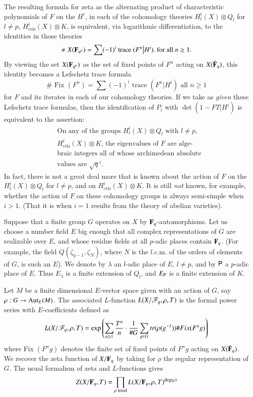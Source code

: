 The resulting formula for zeta as the alternating product of characteristic polynomials of $F$ on the $H^i$, in each of the cohomology theories $H^i_l (X) \otimes Q_l$ for $l \neq p$, $H^i_{\text{cris}} (X) \otimes K$, is equivalent, via logarithmic differentiation, to the identities in those theories 
$$
\neq X (\mathbf{F}_{q^n}) = \sum (-1)^i \text{ trace } (F^n \big| H^i). \text{ for all } n \geq 1.
$$
By viewing the set $X(\mathbf{F}_{q^n})$ as the set of fixed points of $F^n$ acting on $X(\bar{\mathbf{F}}_q)$, this identity becomes a Lefschetz trace formula
$$
\# \text{ Fix } (F^n ) =\sum(-1)^i \text{ trace } (F^n \big| H^i) \text{ all } n \geq 1
$$
for $F$ and its iterates in each of our cohomology theories. If we take as \textit{given} these Lefschetz trace formulas, then the identification of $P_i$ with $\det (1 - F T \big| H^i)$ is equivalent to the assertion:
\begin{align*}
&\text{On any of the groups $H^i_l(X) \otimes Q_l$ with $l \neq p$,}\\
&\text{$H^i_{\text{cris}} (X) \otimes K$, the eigenvalues of $F$ are alge-}\\
&\text{braic integers all of whose archimedean absolute}\\
&\text{values are $\sqrt{q}^i$.}
\end{align*}
In fact, there is not a great deal more that is known about the action of $F$ on the $H^i_l(X) \otimes Q_l$ for $l \neq p$, and on $H^i_{\text{cris}} (X)  \otimes K$. It is still \textit{not} known, for example, whether the action of $F$ on these cohomology groups is always semi-simple when $i>1$. (That it is when $i =1$ results from the theory of abelian varieties).

Suppose that a finite group $G$ operates on $X$ by $\mathbf{F}_q$-automorphisms. Let us choose a number field $E$ big enough that all complex representations of $G$ are realizable over $E$, and whose residue fields at all $p$-adic places contain $\mathbf{F}_q$. (For example, the field $Q(\zeta_{q-1}, \zeta_N)$, where $N$ is the $l$.c.m. of the orders of elements of $G$, is such an $E$). We denote by $\lambda$ an $l$-adic place of $E$, $l \neq p$, and by $\mathsf{P}$ a $p$-adic place of $E$. Thus $E_\lambda$ is a finite extension of $Q_l$, and $E_{\mathsf{P}}$ is a finite extension of $K$.

Let $M$ be a finite dimensional $E$-vector space given with an action of $G$, say $\rho : G \to \operatorname{Aut}_E (M)$. The associated $L$-function $L(X/\mathscr{F}_q, \rho, T)$ is the formal power series with $E$-coefficients defined as 
$$
L(X/\mathscr{F}_q, \rho, T) = \exp \left(\sum\limits_{n \geq 1} \frac{T^n}{n} \cdot \frac{1}{\# G} \sum\limits_{g \in G} tr (\rho (g^{-1})) \# Fix (F^n g) \right)
$$\pageoriginale
where Fix $(F^n g)$ denotes the finite set of fixed points of $F^ng$ acting on $X(\bar{\mathbf{F}}_q)$. We recover the zeta function of $X/\mathbf{F}_q$ by taking for $\rho$ the regular representation of $G$. The usual formalism of zeta and $L$-functions gives 
$$
Z(X/ \mathbf{F}_q, T) = \prod\limits_{\rho \text{ irred}} L (X / \mathbf{F}_q, \rho, T)^{\deg (\rho)}
$$

